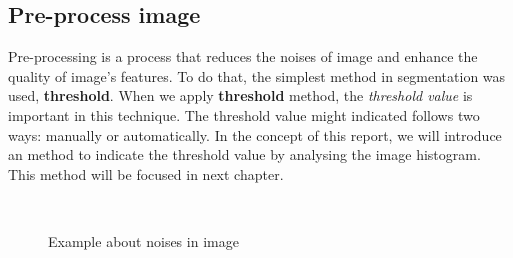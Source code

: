\subsection{Pre-process image}
Pre-processing is a process that reduces the noises of image and enhance the quality of image's features. To do that, the simplest method in segmentation was used, \textbf{threshold}. When we apply \textbf{threshold} method, the \textit{threshold value} is important in this technique. The threshold value might indicated follows two ways: manually or automatically. In the concept of this report, we will introduce an method to indicate the threshold value by analysing the image histogram. This method will be focused in next chapter.
\begin{figure}[h!]
\centering
{}~~
\caption{Example about noises in image}
\label{fig:figure_12}
\end{figure}
